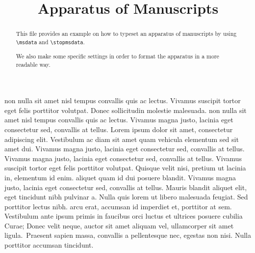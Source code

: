 \documentclass{article}
\begin{document}
\begin{english}
\title{Apparatus of Manuscripts}
\date{}
\maketitle

\begin{abstract}
This file provides an example on how to typeset an apparatus of manuscripts by using \verb+\msdata+ and \verb+\stopmsdata+.

We also make some specific settings in order to format the apparatus in a more readable way.
\end{abstract}
\end{english}

\beginnumbering
\autopar


 non nulla sit amet nisl tempus convallis quis ac lectus. Vivamus suscipit tortor eget felis porttitor volutpat. Donec sollicitudin molestie malesuada.  non nulla sit amet nisl tempus convallis quis ac lectus. Vivamus magna justo, lacinia eget consectetur sed, convallis at tellus. Lorem ipsum dolor sit amet, consectetur adipiscing elit. Vestibulum ac diam sit amet quam vehicula elementum sed sit amet dui. Vivamus magna justo, lacinia eget consectetur sed, convallis at tellus. Vivamus magna justo, lacinia eget consectetur sed, convallis at tellus. Vivamus suscipit tortor eget felis porttitor volutpat. Quisque velit nisi, pretium ut lacinia in, elementum id enim.  aliquet quam id dui posuere blandit. Vivamus magna justo, lacinia eget consectetur sed, convallis at tellus. Mauris blandit aliquet elit, eget tincidunt nibh pulvinar a. Nulla quis lorem ut libero malesuada feugiat. Sed porttitor lectus nibh.  arcu erat, accumsan id imperdiet et, porttitor at sem. Vestibulum ante ipsum primis in faucibus orci luctus et ultrices posuere cubilia Curae; Donec velit neque, auctor sit amet aliquam vel, ullamcorper sit amet ligula.\stopmsdata\  Praesent sapien massa, convallis a pellentesque nec, egestas non nisi. Nulla porttitor accumsan tincidunt.
\end{document}
